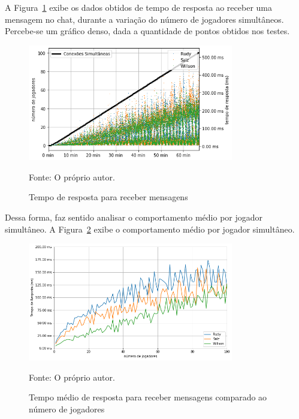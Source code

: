 A Figura~\ref{fig:listen_chat_request_time} exibe os dados obtidos de tempo de resposta ao receber uma mensagem no chat, durante a variação do número de jogadores simultâneos.
%
Percebe-se um gráfico denso, dada a quantidade de pontos obtidos nos testes.

\begin{figure}[htb!]
  \caption{Tempo de resposta para receber mensagens}
  \label{fig:listen_chat_request_time}
  \includegraphics[width=0.8\textwidth]{figuras/analise/rt/listen_chat_request_time}
  \centering

  Fonte: O próprio autor.
\end{figure}


%
Dessa forma, faz sentido analisar o comportamento médio por jogador simultâneo.
%
A Figura~\ref{fig:listen_chat_request_time_per_concurrency} exibe o comportamento médio por jogador simultâneo.

\begin{figure}[htb!]
  \caption{Tempo médio de resposta para receber mensagens comparado ao número de jogadores}
  \label{fig:listen_chat_request_time_per_concurrency}
  \includegraphics[width=0.8\textwidth]{figuras/analise/rt/listen_chat_request_time_per_concurrency}
  \centering

  Fonte: O próprio autor.
\end{figure}

